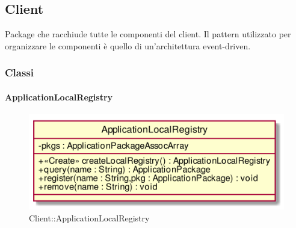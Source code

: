 \subsection{Client}
Package che racchiude tutte le componenti del client. Il pattern utilizzato per organizzare le componenti è quello di un'architettura event-driven.
\subsubsection{Classi}
\hypertarget{ApplicationLocalRegistry_label}{\paragraph{ApplicationLocalRegistry}}
\begin{figure}[h]
	\centering
	\includegraphics[width=\textwidth,height=\textheight,keepaspectratio]{images/ClassApplicationLocalRegistry.png}
	\caption{Client::ApplicationLocalRegistry}
\end{figure}
